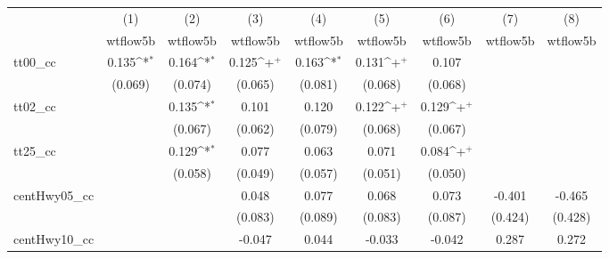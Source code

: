 {
\def\sym#1{\ifmmode^{#1}\else\(^{#1}\)\fi}
\begin{tabular}{l*{8}{c}}
\hline\hline
            &\multicolumn{1}{c}{(1)}&\multicolumn{1}{c}{(2)}&\multicolumn{1}{c}{(3)}&\multicolumn{1}{c}{(4)}&\multicolumn{1}{c}{(5)}&\multicolumn{1}{c}{(6)}&\multicolumn{1}{c}{(7)}&\multicolumn{1}{c}{(8)}\\
            &\multicolumn{1}{c}{wtflow5b}&\multicolumn{1}{c}{wtflow5b}&\multicolumn{1}{c}{wtflow5b}&\multicolumn{1}{c}{wtflow5b}&\multicolumn{1}{c}{wtflow5b}&\multicolumn{1}{c}{wtflow5b}&\multicolumn{1}{c}{wtflow5b}&\multicolumn{1}{c}{wtflow5b}\\
\hline
tt00\_cc     &       0.135\sym{*} &       0.164\sym{*} &       0.125\sym{+} &       0.163\sym{*} &       0.131\sym{+} &       0.107        &                    &                    \\
            &     (0.069)        &     (0.074)        &     (0.065)        &     (0.081)        &     (0.068)        &     (0.068)        &                    &                    \\
[1em]
tt02\_cc     &                    &       0.135\sym{*} &       0.101        &       0.120        &       0.122\sym{+} &       0.129\sym{+} &                    &                    \\
            &                    &     (0.067)        &     (0.062)        &     (0.079)        &     (0.068)        &     (0.067)        &                    &                    \\
[1em]
tt25\_cc     &                    &       0.129\sym{*} &       0.077        &       0.063        &       0.071        &       0.084\sym{+} &                    &                    \\
            &                    &     (0.058)        &     (0.049)        &     (0.057)        &     (0.051)        &     (0.050)        &                    &                    \\
[1em]
centHwy05\_cc&                    &                    &       0.048        &       0.077        &       0.068        &       0.073        &      -0.401        &      -0.465        \\
            &                    &                    &     (0.083)        &     (0.089)        &     (0.083)        &     (0.087)        &     (0.424)        &     (0.428)        \\
[1em]
centHwy10\_cc&                    &                    &      -0.047        &       0.044        &      -0.033        &      -0.042        &       0.287        &       0.272        \\

\end{tabular}}
